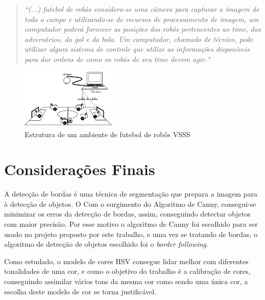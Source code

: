 \begin{quotation}
\textit{
``(...) futebol de robôs considera-se uma câmera para capturar
a imagem de todo o campo e utilizando-se de recursos de processamento de imagem, um
computador poderá fornecer as posições dos robôs pertencentes ao time, dos adversários,
do gol e da bola. Um computador, chamado de técnico, pode utilizar algum sistema de
controle que utilize as informações disponíveis para dar ordens de como os robôs de seu
time devem agir."}\cite{Faria2006}
\end{quotation}
 \begin{figure}[H]
	\centering
	\includegraphics[width=0.4\textwidth]{futbots.pdf}
	\caption{Estrutura de um ambiente de futebol de robôs VSSS\cite{Faria2006}}
	\label{fig:VSSS}
\end{figure} 
\section{Considerações Finais}
A detecção de bordas é uma técnica de segmentação que prepara a imagem para à detecção de objetos. O Com o surgimento do Algoritmo de Canny, consegui-se minimizar os erros da detecção de bordas, assim, conseguindo detectar objetos com maior precisão. Por esse motivo o algoritmo de Canny foi escolhido para ser usado no projeto proposto por este trabalho, e uma vez se tratando de bordas, o algoritmo de detecção de objetos escolhido foi o {\it border following}.

Como estudado, o modelo de cores HSV consegue lidar melhor com diferentes tonalidades de uma cor, e como o objetivo do trabalho é a calibração de cores, conseguindo assimilar vários tons da mesma cor como sendo uma única cor, a escolha deste modelo de cor se torna justificável.